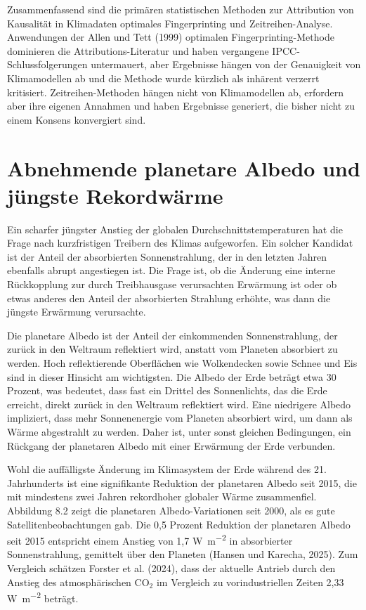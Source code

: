 \documentclass[12pt,paper=a4,DIV=12,parskip=never,chapterprefix=false,headings=standardclasses]{scrreprt}
\begin{document}
Zusammenfassend sind die primären statistischen Methoden zur Attribution von Kausalität in Klimadaten optimales Fingerprinting und Zeitreihen-Analyse. Anwendungen der Allen und Tett (1999) optimalen Fingerprinting-Methode dominieren die Attributions-Literatur und haben vergangene IPCC-Schlussfolgerungen untermauert, aber Ergebnisse hängen von der Genauigkeit von Klimamodellen ab und die Methode wurde kürzlich als inhärent verzerrt kritisiert. Zeitreihen-Methoden hängen nicht von Klimamodellen ab, erfordern aber ihre eigenen Annahmen und haben Ergebnisse generiert, die bisher nicht zu einem Konsens konvergiert sind.

\section{Abnehmende planetare Albedo und jüngste Rekordwärme}
Ein scharfer jüngster Anstieg der globalen Durchschnittstemperaturen hat die Frage nach kurzfristigen Treibern des Klimas aufgeworfen. Ein solcher Kandidat ist der Anteil der absorbierten Sonnenstrahlung, der in den letzten Jahren ebenfalls abrupt angestiegen ist. Die Frage ist, ob die Änderung eine interne Rückkopplung zur durch Treibhausgase verursachten Erwärmung ist oder ob etwas anderes den Anteil der absorbierten Strahlung erhöhte, was dann die jüngste Erwärmung verursachte.

Die planetare Albedo ist der Anteil der einkommenden Sonnenstrahlung, der zurück in den Weltraum reflektiert wird, anstatt vom Planeten absorbiert zu werden. Hoch reflektierende Oberflächen wie Wolkendecken sowie Schnee und Eis sind in dieser Hinsicht am wichtigsten. Die Albedo der Erde beträgt etwa 30 Prozent, was bedeutet, dass fast ein Drittel des Sonnenlichts, das die Erde erreicht, direkt zurück in den Weltraum reflektiert wird. Eine niedrigere Albedo impliziert, dass mehr Sonnenenergie vom Planeten absorbiert wird, um dann als Wärme abgestrahlt zu werden. Daher ist, unter sonst gleichen Bedingungen, ein Rückgang der planetaren Albedo mit einer Erwärmung der Erde verbunden.

Wohl die auffälligste Änderung im Klimasystem der Erde während des 21. Jahrhunderts ist eine signifikante Reduktion der planetaren Albedo seit 2015, die mit mindestens zwei Jahren rekordhoher globaler Wärme zusammenfiel. Abbildung 8.2 zeigt die planetaren Albedo-Variationen seit 2000, als es gute Satellitenbeobachtungen gab. Die 0,5 Prozent Reduktion der planetaren Albedo seit 2015 entspricht einem Anstieg von 1,7 \si{\watt\per\square\meter} in absorbierter Sonnenstrahlung, gemittelt über den Planeten (Hansen und Karecha, 2025). Zum Vergleich schätzen Forster et al. (2024), dass der aktuelle Antrieb durch den Anstieg des atmosphärischen CO$_2$ im Vergleich zu vorindustriellen Zeiten 2,33 \si{\watt\per\square\meter} beträgt.
\end{document}
